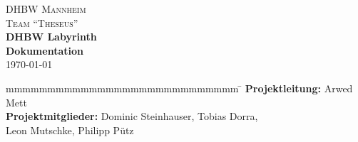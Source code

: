 
\begin{titlepage}
	\begin{center}
        \textsc{\LARGE DHBW Mannheim}\\[1.5em]
        \textsc{\LARGE Team \enquote{Theseus}}\\[1.5em]
        { \huge \bfseries DHBW Labyrinth \\[0.5cm] }
        { \LARGE \bfseries Dokumentation \\[0.4cm] }
        \today
	\end{center}
	\vfill
	\begin{spacing}{1.2}
	\begin{tabbing}
		mmmmmmmmmmmmmmmmmmmmmmmmmmmm \= \kill
        \textbf{Projektleitung:}        \> Arwed Mett\\
        \textbf{Projektmitglieder:}       \> Dominic Steinhauser, Tobias Dorra,\\
     								   \> Leon Mutschke, Philipp Pütz\\
	\end{tabbing}
	\end{spacing}
\end{titlepage}
